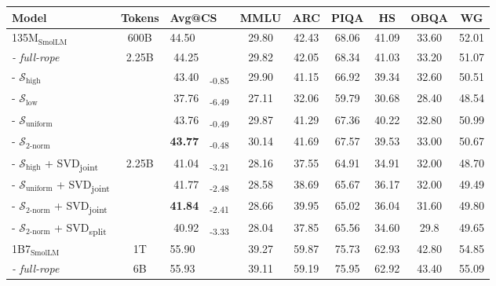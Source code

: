 \begin{table*}[t]
\centering
\small
\begin{tabular}{lcr@{\hspace{2pt}}lcccccc}
  \toprule
  \textbf{Model} & \textbf{Tokens} & \multicolumn{2}{l}{\textbf{Avg@CS}} & \textbf{MMLU} & \textbf{ARC} & \textbf{PIQA} & \textbf{HS} & \textbf{OBQA} & \textbf{WG}\\
  \midrule
  \rowcolor{gray!10}135M$_{\text{SmolLM}}$ & 600B & \multicolumn{2}{l}{44.50} & 29.80 & 42.43 & 68.06 & 41.09 & 33.60 & 52.01\\
  \textit{- full-rope} & \multirow{5}{*}{2.25B}  & 44.25 &  & 29.82 & 42.05 & 68.34 & 41.03 & 33.20 & 51.07 \\
  - $\mathcal{S}_{\text{high}}$ &   & 43.40&\textsubscript{-0.85} & 29.90 & 41.15 & 66.92 & 39.34 & 32.60 & 50.51 \\
  - $\mathcal{S}_{\text{low}}$ &   & 37.76&\textsubscript{-6.49} & 27.11 & 32.06 & 59.79 & 30.68 & 28.40 & 48.54 \\
  - $\mathcal{S}_{\text{uniform}}$ &   & 43.76&\textsubscript{-0.49} & 29.87 & 41.29 & 67.36 & 40.22 & 32.80 & 50.99 \\
  - $\mathcal{S}_{\text{2-norm}}$ &   & \bf 43.77&\textsubscript{-0.48} & 30.14 & 41.69 & 67.57 & 39.53 & 33.00 & 50.67 \\
  \arrayrulecolor{gray!20}
  \hline
  - $\mathcal{S}_{\text{high}}$ + SVD\textsubscript{joint} & \multirow{4}{*}{2.25B} & 41.04&\textsubscript{-3.21} & 28.16 & 37.55 & 64.91 & 34.91 & 32.00 & 48.70 \\
  - $\mathcal{S}_{\text{uniform}}$ + SVD\textsubscript{joint} &  & 41.77&\textsubscript{-2.48} & 28.58 & 38.69 & 65.67 & 36.17 & 32.00 & 49.49 \\
  - $\mathcal{S}_{\text{2-norm}}$ + SVD\textsubscript{joint} &   & \bf 41.84&\textsubscript{-2.41} & 28.66 & 39.95 & 65.02 & 36.04 & 31.60 & 49.80\\
  - $\mathcal{S}_{\text{2-norm}}$ + SVD\textsubscript{split} &  & 40.92 & \textsubscript{-3.33} & 28.04 & 37.85 & 65.56 & 34.60 & 29.8 & 49.65 \\
  \arrayrulecolor{black}
  \midrule
  \rowcolor{gray!10}1B7$_{\text{SmolLM}}$ & 1T & \multicolumn{2}{l}{55.90} & 39.27 & 59.87 & 75.73 & 62.93 & 42.80 & 54.85 \\
  \textit{- full-rope} & \multirow{5}{*}{6B}  & \multicolumn{2}{l}{55.93} & 39.11 & 59.19 & 75.95 & 62.92 & 43.40 & 55.09 \\

\end{tabular}
\end{table*}
